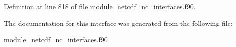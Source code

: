 Definition at line 818 of file module\+\_\+netcdf\+\_\+nc\+\_\+interfaces.\+f90.



The documentation for this interface was generated from the following file\+:\begin{DoxyCompactItemize}
\item 
\hyperlink{module__netcdf__nc__interfaces_8f90}{module\+\_\+netcdf\+\_\+nc\+\_\+interfaces.\+f90}\end{DoxyCompactItemize}
